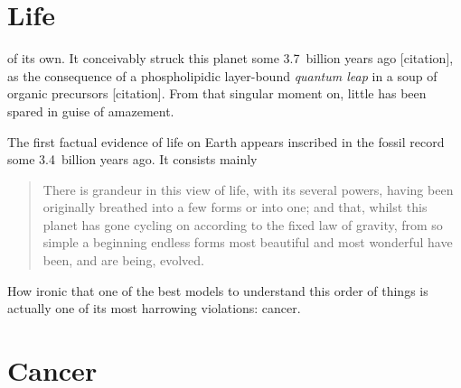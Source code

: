 \documentclass{tufte-book}
\begin{document}
\section{Life}

 of its own.  It conceivably struck this planet some
3.7~billion years ago [citation], as the consequence of a phospholipidic
layer-bound \emph{quantum leap} in a soup of organic precursors
[citation]. From that singular moment on, little has been spared in guise of
amazement.

The first factual evidence of life on Earth appears inscribed in the fossil
record some 3.4~billion years ago. It consists mainly

\begin{quotation}
There is grandeur in this view of life, with its several powers, having been
originally breathed into a few forms or into one; and that, whilst this planet
has gone cycling on according to the fixed law of gravity, from so simple a
beginning endless forms most beautiful and most wonderful have been, and are
being, evolved.
\end{quotation}

How ironic that one of the best models to understand this order of things is
actually one of its most harrowing violations: cancer.

\section{Cancer}
\end{document}
